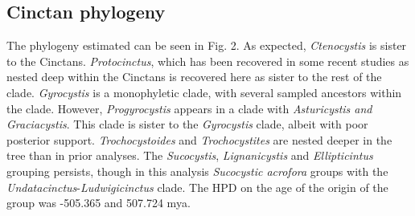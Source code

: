 \documentclass{article}
\begin{document}
\subsection{Cinctan phylogeny}

The phylogeny estimated can be seen in Fig. 2.
As expected, \textit{Ctenocystis} is sister to the Cinctans. 
\textit{Protocinctus}, which has been recovered in some recent studies as nested deep within the Cinctans is recovered here as sister to the rest of the clade. 
\textit{Gyrocystis} is a monophyletic clade, with several sampled ancestors within the clade. 
However, \textit{Progyrocystis} appears in a clade with \textit{Asturicystis and Graciacystis}. 
This clade is sister to the \textit{Gyrocystis} clade, albeit with poor posterior support. 
\textit{Trochocystoides} and \textit{Trochocystites} are nested deeper in the tree than in prior analyses.
The \textit{Sucocystis}, \textit{Lignanicystis} and \textit{Ellipticintus} grouping persists, though in this analysis \textit{Sucocystic acrofora} groups with the \textit{Undatacinctus}-\textit{Ludwigicinctus} clade.
The HPD on the age of the origin of the group was -505.365 and 507.724 mya.
\end{document}
